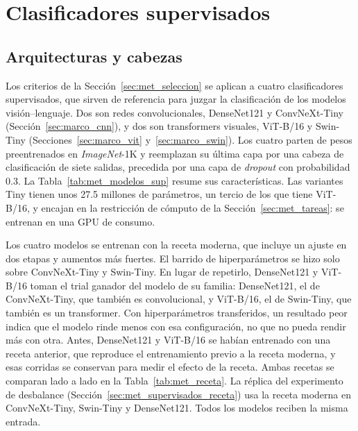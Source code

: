 \section{Clasificadores supervisados}
\label{sec:met_supervisados}

\subsection{Arquitecturas y cabezas}
\label{sec:met_supervisados_arquitecturas}

Los criterios de la Sección~\ref{sec:met_seleccion} se aplican a cuatro clasificadores supervisados, que sirven de
referencia para juzgar la clasificación de los modelos visión--lenguaje. Dos son redes convolucionales, DenseNet121 y
ConvNeXt-Tiny (Sección~\ref{sec:marco_cnn}), y dos son transformers visuales, ViT-B/16 y Swin-Tiny (Secciones~\ref{sec:marco_vit}
y~\ref{sec:marco_swin}). Los cuatro parten de pesos preentrenados en \emph{ImageNet}-1K y reemplazan su última capa por
una cabeza de clasificación de siete salidas, precedida por una capa de \emph{dropout} con probabilidad 0.3. La
Tabla~\ref{tab:met_modelos_sup} resume sus características. Las variantes Tiny tienen unos 27.5 millones de parámetros,
un tercio de los que tiene ViT-B/16, y encajan en la restricción de cómputo de la Sección~\ref{sec:met_tareas}: se
entrenan en una GPU de consumo.

Los cuatro modelos se entrenan con la receta moderna, que incluye un ajuste en dos etapas y aumentos más fuertes. El
barrido de hiperparámetros se hizo solo sobre ConvNeXt-Tiny y Swin-Tiny. En lugar de repetirlo, DenseNet121 y ViT-B/16
toman el trial ganador del modelo de su familia: DenseNet121, el de ConvNeXt-Tiny, que también es convolucional, y
ViT-B/16, el de Swin-Tiny, que también es un transformer. Con hiperparámetros transferidos, un resultado peor indica que
el modelo rinde menos con esa configuración, no que no pueda rendir más con otra. Antes, DenseNet121 y ViT-B/16 se habían
entrenado con una receta anterior, que reproduce el entrenamiento previo a la receta moderna, y esas corridas se conservan
para medir el efecto de la receta.
Ambas recetas se comparan lado a lado en la Tabla~\ref{tab:met_receta}. La réplica del experimento de desbalance
(Sección~\ref{sec:met_supervisados_receta}) usa la receta moderna en ConvNeXt-Tiny, Swin-Tiny y DenseNet121. Todos los
modelos reciben la misma entrada.

